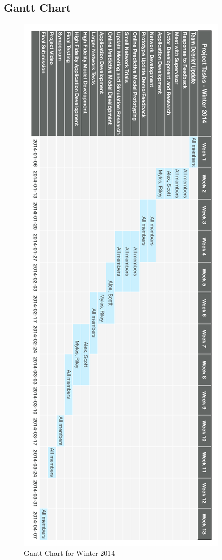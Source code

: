 \documentclass{report}
\begin{document}
\subsection{Gantt Chart}
\begin{figure}[H]
  \begin{centering}
    \includegraphics[scale=0.5, angle=180]{figures/gantt-vertical.png}
    \caption{Gantt Chart for Winter 2014}
    \label{fig:gantt-winter}
  \end{centering}
\end{figure}
\end{document}
